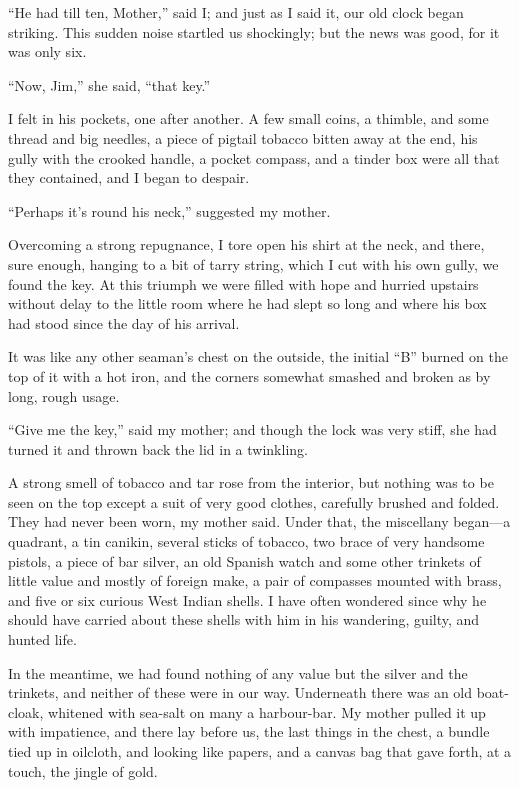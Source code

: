 \enquote{He had till ten, Mother,} said I; and just as I said it, our old clock began striking. This sudden noise startled us shockingly; but the news was good, for it was only six.

\enquote{Now, Jim,} she said, \enquote{that key.}

I felt in his pockets, one after another. A few small coins, a thimble, and some thread and big needles, a piece of pigtail tobacco bitten away at the end, his gully with the crooked handle, a pocket compass, and a tinder box were all that they contained, and I began to despair.

\enquote{Perhaps it’s round his neck,} suggested my mother.

Overcoming a strong repugnance, I tore open his shirt at the neck, and there, sure enough, hanging to a bit of tarry string, which I cut with his own gully, we found the key. At this triumph we were filled with hope and hurried upstairs without delay to the little room where he had slept so long and where his box had stood since the day of his arrival.

It was like any other seaman’s chest on the outside, the initial \enquote{B} burned on the top of it with a hot iron, and the corners somewhat smashed and broken as by long, rough usage.

\enquote{Give me the key,} said my mother; and though the lock was very stiff, she had turned it and thrown back the lid in a twinkling.

A strong smell of tobacco and tar rose from the interior, but nothing was to be seen on the top except a suit of very good clothes, carefully brushed and folded. They had never been worn, my mother said. Under that, the miscellany began---a quadrant, a tin canikin, several sticks of tobacco, two brace of very handsome pistols, a piece of bar silver, an old Spanish watch and some other trinkets of little value and mostly of foreign make, a pair of compasses mounted with brass, and five or six curious West Indian shells. I have often wondered since why he should have carried about these shells with him in his wandering, guilty, and hunted life.

In the meantime, we had found nothing of any value but the silver and the trinkets, and neither of these were in our way. Underneath there was an old boat-cloak, whitened with sea-salt on many a harbour-bar. My mother pulled it up with impatience, and there lay before us, the last things in the chest, a bundle tied up in oilcloth, and looking like papers, and a canvas bag that gave forth, at a touch, the jingle of gold.

